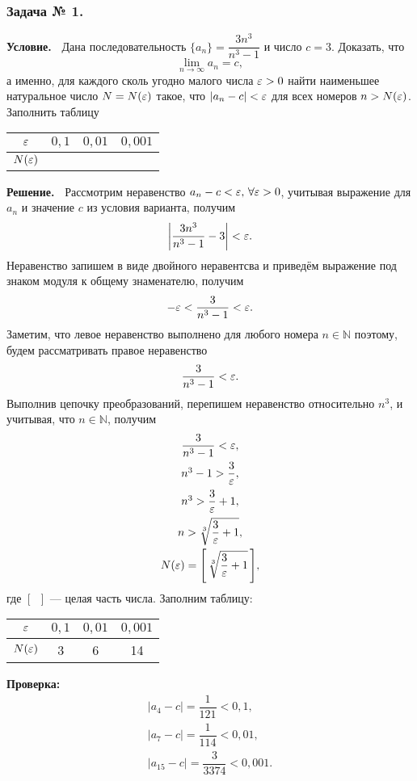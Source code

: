 \subsubsection*{\center Задача № 1.}
{\bf Условие.~}
Дана последовательность $\{a_n\} = \dfrac{3n^3}{n^3-1}$ и число $c=3$. Доказать, что 
$$\lim_{n\to\infty}a_n=c,$$
а именно, для каждого сколь угодно малого числа $\varepsilon>0$ найти наименьшее натуральное число 
$N=N(\varepsilon)$ такое, что $|a_n-c|<\varepsilon$ для всех номеров $n>N(\varepsilon)$.
Заполнить таблицу
\begin{center}
	\begin{tabular}{|c|c|c|c|}
		\hline
		$\varepsilon$ &  $0{,}1$ & $0{,}01$ & $0{,}001$ \\
		\hline
		$N(\varepsilon)$ & & & \\
		\hline
	\end{tabular}
\end{center}
{\bf Решение.~}	
Рассмотрим неравенство $a_n-c<\varepsilon,\,\forall\varepsilon>0$, учитывая выражение для $a_n$ и значение $c$ из условия варианта,
получим
$$
\biggl|\frac{3n^3}{n^3-1}-3\biggr| < \varepsilon.
$$
Неравенство запишем в виде двойного неравентсва и приведём выражение под знаком модуля к общему знаменателю,
получим
$$
-\varepsilon < \frac{3}{n^3-1} < \varepsilon.
$$
Заметим, что левое неравенство выполнено для любого номера $n\in\mathbb{N}$ поэтому, будем рассматривать правое неравенство 
$$
\frac{3}{n^3-1} < \varepsilon.
$$
Выполнив цепочку преобразований, перепишем неравенство относительно $n^3$, и учитывая, что $n\in\mathbb{N}$, получим
$$
\begin{array}{c}
\dfrac{3}{n^3-1} < \varepsilon, 							\\[8pt]
n^3-1 > \dfrac{3}{\varepsilon}, 							\\[8pt]
n^3 > \dfrac{3}{\varepsilon}+1, 	                        \\[8pt]
n > \sqrt[3]{\dfrac{3}{\varepsilon}+1}, 		\\[8pt]
N(\varepsilon) = \Biggl[\,\sqrt[3]{\dfrac{3}{\varepsilon}+1}\,\Biggr],
\end{array}
$$
где $[\phantom{a}]$ --- целая часть числа.
Заполним таблицу:
\begin{center}
	\begin{tabular}{|c|c|c|c|}
		\hline
		$\varepsilon$ &  $0{,}1$ & $0{,}01$ & $0{,}001$ \\
		\hline
		$N(\varepsilon)$ & 3 & 6 & 14 \\
		\hline
	\end{tabular}
\end{center}
\textbf{Проверка:}
$$
\begin{array}{l}
|a_4 - c| = \dfrac{1}{121} < 0{,}1,			\\[10pt]
|a_7 - c| = \dfrac{1}{114} < 0{,}01,  	\\[10pt]
|a_{15} - c| = \dfrac{3}{3374} < 0{,}001.
\end{array}
$$

